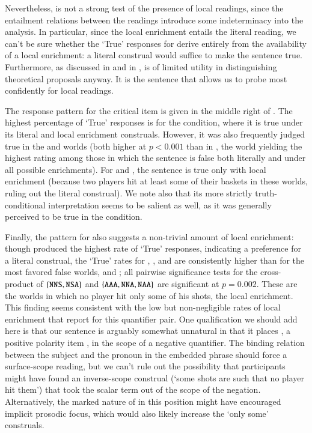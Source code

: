 \documentclass[leqno,12pt]{article}
\begin{document}
Nevertheless,  is not a strong test of the
presence of local readings, since the entailment relations between the
readings introduce some indeterminacy into the analysis. In
particular, since the local enrichment entails the literal reading, we
can't be sure whether the `True' responses for  derive
entirely from the availability of a local enrichment: a literal
construal would suffice to make the sentence true. Furthermore, as
discussed in  and in
\citeauthor{Chemla:Spector:2011},  is of limited
utility in distinguishing theoretical proposals anyway. It is the
 sentence that allows us to probe most
confidently for local readings.

The response pattern for the critical item 
is given in the middle right of . The
highest percentage of `True' responses is for the 
condition, where it is true under its literal and local enrichment
construals. However, it was also frequently judged true in the
 and  worlds (both higher at $p < 0.001$ than in
, the world yielding the highest rating among those in
which the sentence is false both literally and under all possible
enrichments). For  and , the sentence is true
only with local enrichment (because two players hit at least some of
their baskets in these worlds, ruling out the literal construal).  We
note also that its more strictly truth-conditional interpretation
seems to be salient as well, as it was generally perceived to be true
in the  condition.

Finally, the pattern for  also suggests a non-trivial
amount of local enrichment: though  produced the highest
rate of `True' responses, indicating a preference for a literal
construal, the `True' rates for , , and
 are consistently higher than for the most favored false
worlds,  and ; all pairwise significance tests
for the cross-product of $\left\{ \texttt{NNS}, \texttt{NSA} \right\}$ and
$\left\{ \texttt{AAA}, \texttt{NNA}, \texttt{NAA} \right\}$ are significant at
$p = 0.002$. These are the worlds in which no player hit only some of
his shots, the local enrichment. This finding seems consistent with
the low but non-negligible rates of local enrichment that
 report for this quantifier
pair. One qualification we should add here is that our sentence is
arguably somewhat unnatural in that it places , a positive
polarity item \citep{Baker70,Israel96}, in the scope of a negative
quantifier. The binding relation between the subject and the pronoun
 in the embedded phrase should force a surface-scope
reading, but we can't rule out the possibility that participants might
have found an inverse-scope construal (`some shots are such that no
player hit them') that took the scalar term out of the scope of the
negation. Alternatively, the marked nature of  in this
position might have encouraged implicit prosodic focus, which would
also likely increase the `only some' construals.
\end{document}

